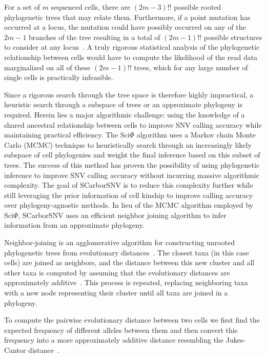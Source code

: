 \documentclass[../../main.tex]{subfiles}
\begin{document}
For a set of $m$ sequenced cells, there are $(2m-3)!!$ possible rooted phylogenetic trees that may relate them.
Furthermore, if a point mutation has occurred at a locus, the mutation could have possibly occurred on any of the $2m-1$  branches of the tree resulting in a total of $(2m-1)!!$ possible structures to consider at any locus~\cite{BSA}.
A truly rigorous statistical analysis of the phylogenetic relationship between cells would have to compute the likelihood of the read data marginalized on all of these $(2m-1)!!$ trees, which for any large number of single cells is practically infeasible.

Since a rigorous search through the tree space is therefore highly impractical, a heuristic search through a subspace of trees or an approximate phylogeny is required.
Herein lies a major algorithmic challenge: using the knowledge of a shared ancestral relationship between cells to improve SNV calling accuracy while maintaining practical efficiency.
The Sci$\Phi$ algorithm uses a Markov chain Monte Carlo (MCMC) technique to heuristically search through an increasingly likely subspace of cell phylogenies and weight the final inference based on this subset of trees.
The success of this method has proven the possibility of using phylogenetic inference to improve SNV calling accuracy without incurring massive algorithmic complexity.
The goal of SCarborSNV is to reduce this complexity further while still leveraging the prior information of cell kinship to improve calling accuracy over phylogeny-agnostic methods.
In lieu of the MCMC algorithm employed by Sci$\Phi$, SCarborSNV uses an efficient neighbor joining algorithm to infer information from an approximate phylogeny.

Neighbor-joining is an agglomerative algorithm for constructing unrooted phylogenetic trees from evolutionary distances~\cite{NJ}.
The closest taxa (in this case cells) are joined as neighbors, and the distance between this new cluster and all other taxa is computed by assuming that the evolutionary distances are approximately additive~\cite{BSA}.
This process is repeated, replacing neighboring taxa with a new node representing their cluster until all taxa are joined in a phylogeny.

To compute the pairwise evolutionary distance between two cells we first find the expected frequency of different alleles between them and then convert this frequency into a more approximately additive distance resembling the Jukes-Cantor distance~\cite{JC, BSA}.
\end{document}
